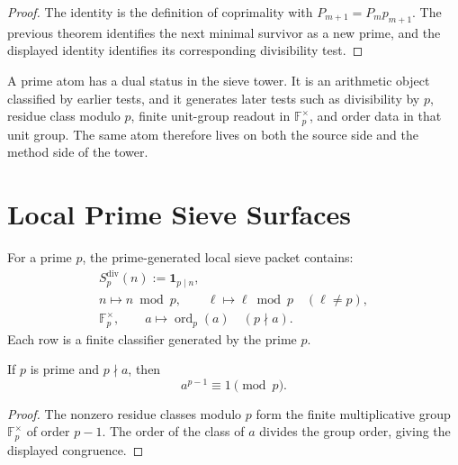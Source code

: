 \begin{proof}
The identity is the definition of coprimality with
$P_{m+1}=P_mp_{m+1}$.  The previous theorem identifies the next minimal
survivor as a new prime, and the displayed identity identifies its
corresponding divisibility test.
\end{proof}

\begin{principle}
\label{prin:rh-prime-atoms-are-sieve-generators}
A prime atom has a dual status in the sieve tower.  It is an arithmetic
object classified by earlier tests, and it generates later tests such
as divisibility by $p$, residue class modulo $p$, finite unit-group
readout in $\mathbb F_p^\times$, and order data in that unit group.  The
same atom therefore lives on both the source side and the method side of
the tower.
\end{principle}

\section{Local Prime Sieve Surfaces}
\label{sec:rh-prime-sieve-tower-local-surfaces}

\begin{definition}
\label{def:rh-prime-generated-local-sieve}
For a prime $p$, the prime-generated local sieve packet contains:
$$
\begin{gathered}
S_p^{\mathrm{div}}(n):=\mathbf 1_{p\mid n},\\
n\longmapsto n\bmod p,\qquad
\ell\longmapsto \ell\bmod p\quad(\ell\ne p),\\
\mathbb F_p^\times,\qquad
a\longmapsto \operatorname{ord}_p(a)\quad(p\nmid a).
\end{gathered}
$$
Each row is a finite classifier generated by the prime $p$.
\end{definition}

\begin{theorem}
\label{thm:rh-fermat-unit-row}
If $p$ is prime and $p\nmid a$, then
$$
a^{p-1}\equiv1\pmod p.
$$
\end{theorem}

\begin{proof}
The nonzero residue classes modulo $p$ form the finite multiplicative
group $\mathbb F_p^\times$ of order $p-1$.  The order of the class of
$a$ divides the group order, giving the displayed congruence.
\end{proof}

